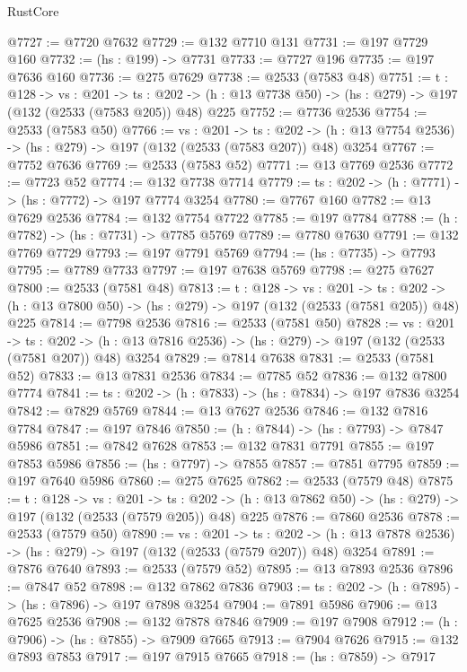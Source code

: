 \begin{lexlean}{RustCore}
\begin{coremodule}
@7727 := @7720 @7632
@7729 := @132 @7710 @131
@7731 := @197 @7729 @160
@7732 := (hs : @199) -> @7731
@7733 := @7727 @196
@7735 := @197 @7636 @160
@7736 := @275 @7629
@7738 := @2533 (@7583 @48)
@7751 := {t : @128} ->
  {vs : @201} ->
  {ts : @202} -> (h : @13 @7738 @50) -> (hs : @279) -> @197 (@132 (@2533 (@7583 @205)) @48) @225
@7752 := @7736 @2536
@7754 := @2533 (@7583 @50)
@7766 := {vs : @201} ->
  {ts : @202} -> (h : @13 @7754 @2536) -> (hs : @279) -> @197 (@132 (@2533 (@7583 @207)) @48) @3254
@7767 := @7752 @7636
@7769 := @2533 (@7583 @52)
@7771 := @13 @7769 @2536
@7772 := @7723 @52
@7774 := @132 @7738 @7714
@7779 := {ts : @202} -> (h : @7771) -> (hs : @7772) -> @197 @7774 @3254
@7780 := @7767 @160
@7782 := @13 @7629 @2536
@7784 := @132 @7754 @7722
@7785 := @197 @7784
@7788 := (h : @7782) -> (hs : @7731) -> @7785 @5769
@7789 := @7780 @7630
@7791 := @132 @7769 @7729
@7793 := @197 @7791 @5769
@7794 := (hs : @7735) -> @7793
@7795 := @7789 @7733
@7797 := @197 @7638 @5769
@7798 := @275 @7627
@7800 := @2533 (@7581 @48)
@7813 := {t : @128} ->
  {vs : @201} ->
  {ts : @202} -> (h : @13 @7800 @50) -> (hs : @279) -> @197 (@132 (@2533 (@7581 @205)) @48) @225
@7814 := @7798 @2536
@7816 := @2533 (@7581 @50)
@7828 := {vs : @201} ->
  {ts : @202} -> (h : @13 @7816 @2536) -> (hs : @279) -> @197 (@132 (@2533 (@7581 @207)) @48) @3254
@7829 := @7814 @7638
@7831 := @2533 (@7581 @52)
@7833 := @13 @7831 @2536
@7834 := @7785 @52
@7836 := @132 @7800 @7774
@7841 := {ts : @202} -> (h : @7833) -> (hs : @7834) -> @197 @7836 @3254
@7842 := @7829 @5769
@7844 := @13 @7627 @2536
@7846 := @132 @7816 @7784
@7847 := @197 @7846
@7850 := (h : @7844) -> (hs : @7793) -> @7847 @5986
@7851 := @7842 @7628
@7853 := @132 @7831 @7791
@7855 := @197 @7853 @5986
@7856 := (hs : @7797) -> @7855
@7857 := @7851 @7795
@7859 := @197 @7640 @5986
@7860 := @275 @7625
@7862 := @2533 (@7579 @48)
@7875 := {t : @128} ->
  {vs : @201} ->
  {ts : @202} -> (h : @13 @7862 @50) -> (hs : @279) -> @197 (@132 (@2533 (@7579 @205)) @48) @225
@7876 := @7860 @2536
@7878 := @2533 (@7579 @50)
@7890 := {vs : @201} ->
  {ts : @202} -> (h : @13 @7878 @2536) -> (hs : @279) -> @197 (@132 (@2533 (@7579 @207)) @48) @3254
@7891 := @7876 @7640
@7893 := @2533 (@7579 @52)
@7895 := @13 @7893 @2536
@7896 := @7847 @52
@7898 := @132 @7862 @7836
@7903 := {ts : @202} -> (h : @7895) -> (hs : @7896) -> @197 @7898 @3254
@7904 := @7891 @5986
@7906 := @13 @7625 @2536
@7908 := @132 @7878 @7846
@7909 := @197 @7908
@7912 := (h : @7906) -> (hs : @7855) -> @7909 @7665
@7913 := @7904 @7626
@7915 := @132 @7893 @7853
@7917 := @197 @7915 @7665
@7918 := (hs : @7859) -> @7917

\end{coremodule}
\end{lexlean}
